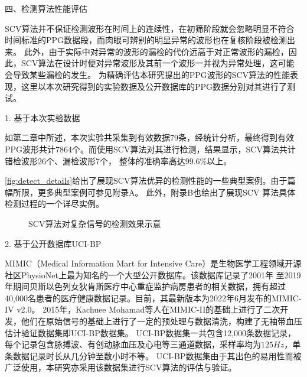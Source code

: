 四、检测算法性能评估

SCV算法并不保证检测波形在时间上的连续性，在初筛阶段就会忽略明显不符合时间标准的PPG数据段，而肉眼可辨别的明显异常的波形也在复核阶段被检测出来。
此外，由于实际中对异常的波形的漏检的代价远高于对正常波形的漏检，因此，SCV算法在设计时便对异常波形及其前一个波形一并视为异常处理，这可能会导致某些漏检的发生。
为精确评估本研究提出的PPG波形的SCV算法的性能表现，这里以本次研究得到的实验数据及公开数据库的PPG数据分别对其进行了测试。

1. 基于本次实验数据

如第二章中所述，本次实验共采集到有效数据79条，经统计分析，最终得到有效PPG波形共计7864个。而使用SCV算法对其进行检测，结果显示，SCV算法共计错检波形26个、漏检波形7个，
整体的准确率高达$99.6\%$以上。

\autoref{fig:detect_details}给出了展现SCV算法优异的检测性能的一些典型案例。由于篇幅所限，更多典型案例可参见附录A。
此外，附录B也给出了展现SCV 算法具体检测过程的一个详尽实例。
\begin{figure}[h]
    \centering
    \quad
    \quad
    \quad
    \caption{\label{fig:detect_details}SCV算法对复杂信号的检测效果示意}
\end{figure}

2. 基于公开数据库UCI-BP

MIMIC（Medical Information Mart for Intensive Care）是生物医学工程领域开源社区PhysioNet上最为知名的一个大型公开数据库\cite{mit2022,Goldberger2000,johnson2018mimic}。该数据库记录了2001年
至2019年期间贝斯以色列女狄肯斯医疗中心重症监护病房患者的相关数据，拥有超过40,000名患者的医疗健康数据记录\cite{johnson2018mimic}。目前，其最新版本为2022年6月发布的MIMIC-IV v2.0\cite{mimic4}。
2015年，Kachuee Mohamad等人在MIMIC-II的基础上进行了二次开发，他们在原始信号的基础上进行了一定的预处理与数据清洗，构建了无袖带血压估计验证数据集即UCI-BP数据集\cite{Kachuee2015,ucibp2022}。
UCI-BP数据集一共包含12,000条数据记录，每个记录包含脉搏波、有创动脉血压及心电等三通道数据，采样率均为$125Hz$，单条数据记录时长从几分钟至数小时不等。
UCI-BP数据集由于其出色的易用性而被广泛使用，本研究亦采用该数据集进行SCV算法的评估与验证。

